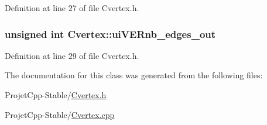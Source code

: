 Definition at line 27 of file Cvertex.\+h.

\hypertarget{class_cvertex_a9b4b73496d3b28aef0912519d774572f}{}
\subsubsection[{ui\+V\+E\+Rnb\+\_\+edges\+\_\+out}]{\setlength{\rightskip}{0pt plus 5cm}unsigned int Cvertex\+::ui\+V\+E\+Rnb\+\_\+edges\+\_\+out\hspace{0.3cm}{\ttfamily [private]}}\label{class_cvertex_a9b4b73496d3b28aef0912519d774572f}


Definition at line 29 of file Cvertex.\+h.



The documentation for this class was generated from the following files\+:\begin{DoxyCompactItemize}
\item 
Projet\+Cpp-\/\+Stable/\hyperlink{_cvertex_8h}{Cvertex.\+h}\item 
Projet\+Cpp-\/\+Stable/\hyperlink{_cvertex_8cpp}{Cvertex.\+cpp}\end{DoxyCompactItemize}
